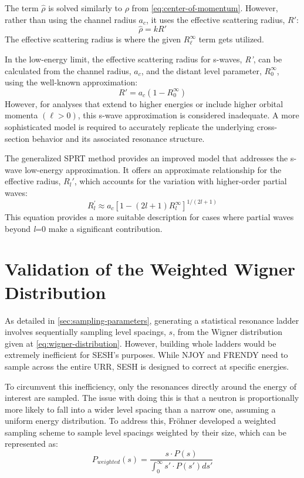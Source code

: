         The term $\hat{\rho}$ is solved similarly to $\rho$ from \autoref{eq:center-of-momentum}. However, rather than using the channel radius $a_c$, it uses the effective scattering radius, $R'$:
        \begin{equation}
            \hat{\rho} = kR'
        \end{equation}
        The effective scattering radius is where the given $R^\infty_\ell$ term gets utilized.

        In the low-energy limit, the effective scattering radius for s-waves, \textit{R'}, can be calculated from the channel radius, $a_c$, and the distant level parameter, $R_0^\infty$, using the well-known approximation:
        \begin{equation}
            R' = a_c (1 - R_0^\infty) \label{eq:1}
        \end{equation}
        However, for analyses that extend to higher energies or include higher orbital momenta $(\ell > 0)$, this s-wave approximation is considered inadequate\cite{jeff18}. A more sophisticated model is required to accurately replicate the underlying cross-section behavior and its associated resonance structure.
        
        The generalized SPRT method\cite{sprt} provides an improved model that addresses the s-wave low-energy approximation. It offers an approximate relationship for the effective radius, $R_l'$, which accounts for the variation with higher-order partial waves:
        \begin{equation}
            R_l^{\prime} \approx a_c\left[1-(2 l+1) R_l^{\infty}\right]^{1 /(2 l+1)}
        \end{equation}
        This equation provides a more suitable description for cases where partial waves beyond \textit{l}=0 make a significant contribution.

\section{Validation of the Weighted Wigner Distribution}
As detailed in \autoref{sec:sampling-parameters}, generating a statistical resonance ladder involves sequentially  sampling level spacings, $s$, from the Wigner distribution given at \autoref{eq:wigner-distribution}. However, building whole ladders would be extremely inefficient for SESH's purposes. While NJOY and FRENDY need to sample across the entire URR, SESH is designed to correct at specific energies.

To circumvent this inefficiency, only the resonances directly around the energy of interest are sampled. The issue with doing this is that a neutron is proportionally more likely to fall into a wider level spacing than a narrow one, assuming a uniform energy distribution. To address this, Fr\"{o}hner developed a weighted sampling scheme to sample level spacings weighted by their size, which can be represented as:
\begin{equation}
    \label{eq:weighted-wigner}
    P_{weighted}(s) = \frac{s \cdot P(s)}{\displaystyle\int_0^\infty s' \cdot P(s') ds'}
\end{equation}

